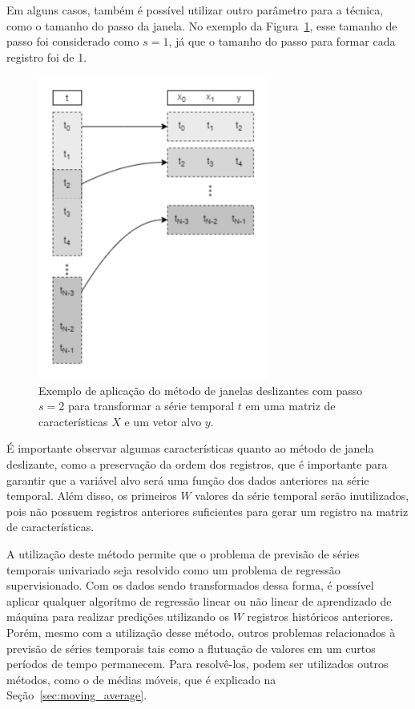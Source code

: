 Em alguns casos, também é possível utilizar outro parâmetro para a técnica, como o tamanho do passo da janela. No exemplo da Figura~\ref{fig:sliding_window_2}, esse tamanho de passo foi considerado como $s=1$, já que o tamanho do passo para formar cada registro foi de 1.

\begin{figure}[!htp]
    \centering
    \includegraphics[width=3.0in]{img/sliding_window_2.pdf}
    \caption{Exemplo de aplicação do método de janelas deslizantes com passo $s=2$  para transformar a série temporal $t$ em uma matriz de características $X$ e um vetor alvo $y$.}
    \label{fig:sliding_window_2}
\end{figure}

É importante observar algumas características quanto ao método de janela deslizante, como a preservação da ordem dos registros, que é importante para garantir que a variável alvo será uma função dos dados anteriores na série temporal. Além disso, os primeiros $W$ valores da série temporal serão inutilizados, pois não possuem registros anteriores suficientes para gerar um registro na matriz de características.

A utilização deste método permite que o problema de previsão de séries temporais univariado seja resolvido como um problema de regressão supervisionado. Com os dados sendo transformados dessa forma, é possível aplicar qualquer algorítmo de regressão linear ou não linear de aprendizado de máquina para realizar predições utilizando os $W$ registros históricos anteriores. Porém, mesmo com a utilização desse método, outros problemas relacionados à previsão de séries temporais tais como a flutuação de valores em um curtos períodos de tempo permanecem. Para resolvê-los, podem ser utilizados outros métodos, como o de médias móveis, que é explicado na Seção~\ref{sec:moving_average}.

